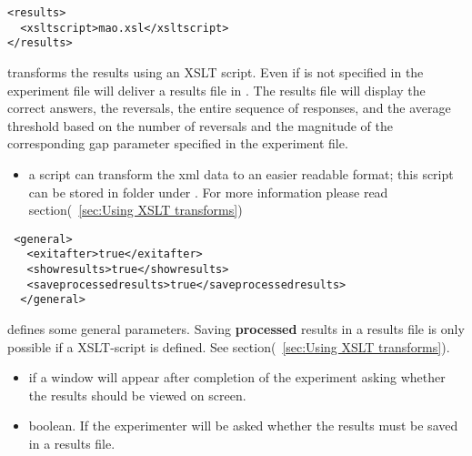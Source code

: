 \begin{lstlisting}
<results>
  <xsltscript>mao.xsl</xsltscript>
</results>
\end{lstlisting}

 transforms the results using an XSLT script.
Even if  is not specified in the experiment file
\apex will deliver a results file in . The results file
will display the correct answers, the reversals, the entire
sequence of responses, and the average threshold based on the
number of reversals and the magnitude of the corresponding gap
parameter specified in the experiment file.

\begin{itemize}
\item {} a script can transform the xml data to
an easier readable format; this script can be stored in folder
 under \apex. For more information please read
section(~\ref{sec:Using XSLT transforms})
\end{itemize}



\begin{lstlisting}
 <general>
   <exitafter>true</exitafter>
   <showresults>true</showresults>
   <saveprocessedresults>true</saveprocessedresults>
  </general>
\end{lstlisting}

 defines some general parameters. Saving
\textbf{processed} results in a results file is only possible if a
XSLT-script is defined. See section(~\ref{sec:Using XSLT
transforms}).

\begin{itemize}
\item {} if  a window will appear
after completion of the experiment asking whether the results
should be viewed on screen.

\item {} boolean. If  the
experimenter will be asked whether the results must be saved in a
results file.
\end{itemize}
